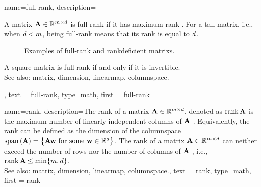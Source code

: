  {name={full-rank},
  description={A \gls{matrix} ${\bf A} \in \mathbb{R}^{m \times d}$ 
  is full-rank if it has maximum \gls{rank} \cite{StrangLinAlg2016}. 
  For a tall \gls{matrix}, i.e., when $d < m$, being 
  full-rank means that its \gls{rank} is equal to $d$. 
 \begin{figure}[H]
\centering
{}
\caption{Examples of full-rank and \gls{rankdeficient} \glspl{matrix}.}
\end{figure} 
  A square matrix is full-rank if and 
  only if it is invertible. \\ 
  See also: \gls{matrix}, \gls{dimension}, \gls{linearmap}, \gls{columnspace}.}, 
  text = {full-rank}, 
  type=math,
  first = {full-rank} 
 }

{name={rank},
 description={The rank of a \gls{matrix} ${\bf A} \in \mathbb{R}^{m \times d}$, 
 denoted as $\operatorname*{rank}{{\bf A}}$ is the maximum number of linearly independent columns 
 of ${\bf A}$ \cite{StrangLinAlg2016}. Equivalently, the rank can be defined as the 
 \gls{dimension} of the \gls{columnspace} ${\rm span}\left({\bf A} \right) = \big\{ {\bf A} {\bf w} \mbox{ for some } 
 {\bf w} \in \mathbb{R}^{d} \big\}$. The rank of a \gls{matrix} 
 ${\bf A} \in \mathbb{R}^{m \times d}$ can neither exceed the 
 number of rows nor the number of columns of ${\bf A}$ \cite{Horn91,MeyerMatrixAnalysis}, i.e., $\operatorname*{rank}{{\bf A}} \leq \min \{ m, d \}$.   \\ 
 See also: \gls{matrix}, \gls{dimension}, \gls{linearmap}, \gls{columnspace}.}, 
text = {rank}, 
type=math,
first = {rank} 
}

